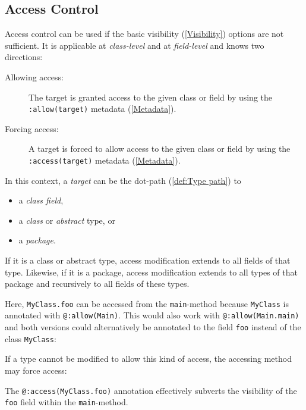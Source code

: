 \documentclass{article}
\newcommand{\type}[1]{\texttt{#1}}
\newcommand{\expr}[1]{\texttt{#1}}
\newcommand{\tref}[2]{#1 (\ref{#2})}
\newcommand{\haxe}[2][]{%
}
\begin{document}
\subsection{Access Control}
\label{Access Control}

Access control can be used if the basic \tref{visibility}{Visibility} options are not sufficient. It is applicable at \emph{class-level} and at \emph{field-level} and knows two directions:

\begin{description}
	\item[Allowing access:] The target is granted access to the given class or field by using the \expr{:allow(target)} \tref{metadata}{Metadata}.
	\item[Forcing access:] A target is forced to allow access to the given class or field by using the \expr{:access(target)} \tref{metadata}{Metadata}.
\end{description}

In this context, a \emph{target} can be the \tref{dot-path}{def:Type path} to

\begin{itemize}
	\item a \emph{class field},
	\item a \emph{class} or \emph{abstract} type, or
	\item a \emph{package}.
\end{itemize}

If it is a class or abstract type, access modification extends to all fields of that type. Likewise, if it is a package, access modification extends to all types of that package and recursively to all fields of these types.

\haxe{assets/ACL.hx}

Here, \expr{MyClass.foo} can be accessed from the \expr{main}-method because \type{MyClass} is annotated with \expr{@:allow(Main)}. This would also work with \expr{@:allow(Main.main)} and both versions could alternatively be annotated to the field \expr{foo} instead of the class \type{MyClass}:

\haxe{assets/ACL2.hx}

If a type cannot be modified to allow this kind of access, the accessing method may force access:

\haxe{assets/ACL3.hx}

The \expr{@:access(MyClass.foo)} annotation effectively subverts the visibility of the \expr{foo} field within the \expr{main}-method. 
\end{document}
